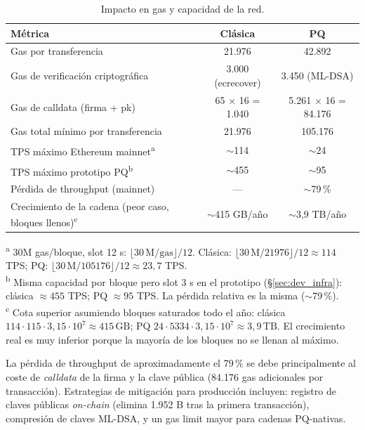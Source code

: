 \begin{table}[htbp]
\centering
\caption{Impacto en gas y capacidad de la red.}
\label{tab:gas_impact}
\begin{tabular}{@{}lcc@{}}
\toprule
\textbf{Métrica} & \textbf{Clásica} & \textbf{PQ} \\
\midrule
Gas por transferencia & 21.976 & 42.892 \\
Gas de verificación criptográfica & 3.000 (ecrecover) & 3.450 (ML-DSA) \\
Gas de calldata (firma + pk) & 65 $\times$ 16 = 1.040 & 5.261 $\times$ 16 = 84.176 \\
Gas total mínimo por transferencia & 21.976 & 105.176 \\
TPS máximo Ethereum mainnet\textsuperscript{a} & $\sim$114 & $\sim$24 \\
TPS máximo prototipo PQ\textsuperscript{b} & $\sim$455 & $\sim$95 \\
Pérdida de throughput (mainnet) & --- & $\sim$79\,\% \\
Crecimiento de la cadena (peor caso, bloques llenos)\textsuperscript{c} & $\sim$415 GB/año & $\sim$3{,}9 TB/año \\
\bottomrule
\end{tabular}

\vspace{2pt}
\footnotesize\textsuperscript{a} 30M gas/bloque, slot 12 s: $\lfloor 30\,\text{M}/\text{gas}\rfloor/12$. Clásica: $\lfloor 30\,\text{M}/21976\rfloor/12 \approx 114$ TPS; PQ: $\lfloor 30\,\text{M}/105176\rfloor/12 \approx 23{,}7$ TPS. \\
\textsuperscript{b} Misma capacidad por bloque pero slot 3 s en el prototipo (\S\ref{sec:dev_infra}): clásica $\approx 455$ TPS; PQ $\approx 95$ TPS. La pérdida relativa es la misma ($\sim$79\,\%). \\
\textsuperscript{c} Cota superior asumiendo bloques saturados todo el año: clásica $114 \cdot 115 \cdot 3{,}15 \cdot 10^7 \approx 415\,\text{GB}$; PQ $24 \cdot 5334 \cdot 3{,}15 \cdot 10^7 \approx 3{,}9\,\text{TB}$. El crecimiento real es muy inferior porque la mayoría de los bloques no se llenan al máximo.
\end{table}

La pérdida de throughput de aproximadamente el 79\,\% se debe principalmente al coste de \emph{calldata} de la firma y la clave pública (84.176 gas adicionales por transacción). Estrategias de mitigación para producción incluyen: registro de claves públicas \emph{on-chain} (elimina 1.952 B tras la primera transacción), compresión de claves ML-DSA, y un gas limit mayor para cadenas PQ-nativas.

